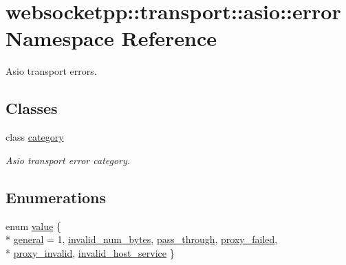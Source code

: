\hypertarget{namespacewebsocketpp_1_1transport_1_1asio_1_1error}{}\section{websocketpp\+:\+:transport\+:\+:asio\+:\+:error Namespace Reference}
\label{namespacewebsocketpp_1_1transport_1_1asio_1_1error}


Asio transport errors.  


\subsection*{Classes}
\begin{DoxyCompactItemize}
\item 
class \hyperlink{classwebsocketpp_1_1transport_1_1asio_1_1error_1_1category}{category}
\begin{DoxyCompactList}\small\item\em Asio transport error category. \end{DoxyCompactList}\end{DoxyCompactItemize}
\subsection*{Enumerations}
\begin{DoxyCompactItemize}
\item 
enum \hyperlink{namespacewebsocketpp_1_1transport_1_1asio_1_1error_aeb44b27fc0ffac2a8991bf629cbfd045}{value} \{ \\*
\hyperlink{namespacewebsocketpp_1_1transport_1_1asio_1_1error_aeb44b27fc0ffac2a8991bf629cbfd045a883593fb292745d5e7dc0edb402fd23a}{general} = 1, 
\hyperlink{namespacewebsocketpp_1_1transport_1_1asio_1_1error_aeb44b27fc0ffac2a8991bf629cbfd045ac5a5a94c79697f82d95d1f6d3a35e02c}{invalid\+\_\+num\+\_\+bytes}, 
\hyperlink{namespacewebsocketpp_1_1transport_1_1asio_1_1error_aeb44b27fc0ffac2a8991bf629cbfd045a46f70de40cb49260f1d5aa454b4ecb78}{pass\+\_\+through}, 
\hyperlink{namespacewebsocketpp_1_1transport_1_1asio_1_1error_aeb44b27fc0ffac2a8991bf629cbfd045a70868b579b442f39074623c5072f86a0}{proxy\+\_\+failed}, 
\\*
\hyperlink{namespacewebsocketpp_1_1transport_1_1asio_1_1error_aeb44b27fc0ffac2a8991bf629cbfd045a41380a32ff02e5e43a1ced0318c2f357}{proxy\+\_\+invalid}, 
\hyperlink{namespacewebsocketpp_1_1transport_1_1asio_1_1error_aeb44b27fc0ffac2a8991bf629cbfd045afd008efc340690681fb451d7a4cc8029}{invalid\+\_\+host\+\_\+service}
 \}
\end{DoxyCompactItemize}
